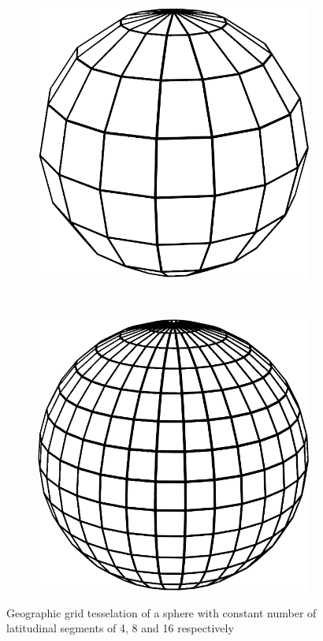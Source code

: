 \begin{figure}
\begin{subfigure}[b]{0.2\textwidth}
        \includegraphics[width=\textwidth]{figures/tessellation/tessellation_geo2.png}
    \end{subfigure}
    ~ %
    \begin{subfigure}[b]{0.2\textwidth}
        \includegraphics[width=\textwidth]{figures/tessellation/tessellation_geo3.png}
    \end{subfigure}
    \caption{Geographic grid tesselation of a sphere with constant number of latitudinal segments of 4, 8 and 16 respectively}
    \label{fig:tesselation_geo}
\end{figure}

